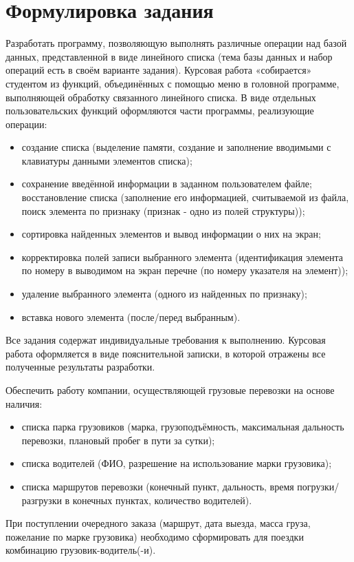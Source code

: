 \section*{Формулировка задания}

Разработать программу, позволяющую выполнять различные операции
над базой данных, представленной в виде линейного списка (тема базы
данных и набор операций есть в своём варианте задания).
Курсовая работа «собирается» студентом из функций, объединённых с
помощью меню в головной программе, выполняющей обработку связанного
линейного списка.
В виде отдельных пользовательских функций оформляются части
программы, реализующие операции:
\begin{itemize}
	\item создание списка (выделение памяти, создание и заполнение вводимыми с
	клавиатуры данными элементов списка);
	\item сохранение введённой информации в заданном пользователем файле;
	восстановление списка (заполнение его информацией, считываемой из
	файла, поиск элемента по признаку (признак - одно из полей структуры));
	\item сортировка найденных элементов и вывод информации о них на экран;
	\item корректировка полей записи выбранного элемента (идентификация
	элемента по номеру в выводимом на экран перечне (по номеру указателя
	на элемент));
	\item удаление выбранного элемента (одного из найденных по признаку);
	\item вставка нового элемента (после/перед выбранным).
\end{itemize}
Все задания содержат индивидуальные требования к выполнению.
Курсовая работа оформляется в виде пояснительной записки, в которой
отражены все полученные результаты разработки.

Обеспечить работу компании, осуществляющей грузовые
перевозки на основе наличия:
\begin{itemize}
	\item списка парка грузовиков (марка, грузоподъёмность, максимальная дальность перевозки, плановый пробег в пути за сутки);
	\item списка водителей (ФИО, разрешение на использование марки грузовика);
	\item списка маршрутов перевозки (конечный пункт, дальность, время
	погрузки/разгрузки в конечных пунктах, количество водителей).
	
\end{itemize}
При поступлении очередного заказа (маршрут, дата выезда, масса груза,
пожелание по марке грузовика) необходимо сформировать для поездки
комбинацию грузовик-водитель(-и).

